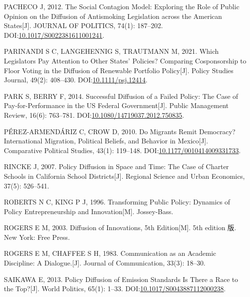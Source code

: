 \documentclass[
  12pt,
]{ctexart}
\newlength{\cslhangindent}
\newlength{\cslentryspacingunit} %
\newenvironment{CSLReferences}[2] %
 {%
  \setlength{\parindent}{0pt}
  \ifodd #1
  \let\oldpar\par
  \def\par{\hangindent=\cslhangindent\oldpar}
  \fi
  \setlength{\parskip}{#2\cslentryspacingunit}
 }%
 {}
\begin{document}
\begin{CSLReferences}{1}{0}
\leavevmode{}%
PACHECO J, 2012. The {Social Contagion Model}: {Exploring} the {Role} of {Public Opinion} on the {Diffusion} of {Antismoking Legislation} across the {American States}{[}J{]}. JOURNAL OF POLITICS, 74(1): 187--202. DOI:\href{https://doi.org/10.1017/S0022381611001241}{10.1017/S0022381611001241}.

\leavevmode{}%
PARINANDI S C, LANGEHENNIG S, TRAUTMANN M, 2021. Which {Legislators Pay Attention} to {Other States}' {Policies}? {Comparing Cosponsorship} to {Floor Voting} in the {Diffusion} of {Renewable Portfolio Policy}{[}J{]}. Policy Studies Journal, 49(2): 408--430. DOI:\href{https://doi.org/10.1111/psj.12414}{10.1111/psj.12414}.

\leavevmode{}%
PARK S, BERRY F, 2014. Successful {Diffusion} of a {Failed Policy}: {The} Case of Pay-for-Performance in the {US} Federal Government{[}J{]}. Public Management Review, 16(6): 763--781. DOI:\href{https://doi.org/10.1080/14719037.2012.750835}{10.1080/14719037.2012.750835}.

\leavevmode{}%
PÉREZ-ARMENDÁRIZ C, CROW D, 2010. Do {Migrants Remit Democracy}? {International Migration}, {Political Beliefs}, and {Behavior} in {Mexico}{[}J{]}. Comparative Political Studies, 43(1): 119--148. DOI:\href{https://doi.org/10.1177/0010414009331733}{10.1177/0010414009331733}.

\leavevmode{}%
RINCKE J, 2007. Policy Diffusion in Space and Time: {The} Case of Charter Schools in {California} School Districts{[}J{]}. Regional Science and Urban Economics, 37(5): 526--541.

\leavevmode{}%
ROBERTS N C, KING P J, 1996. Transforming Public Policy: {Dynamics} of Policy Entrepreneurship and Innovation{[}M{]}. {Jossey-Bass}.

\leavevmode{}%
ROGERS E M, 2003. Diffusion of {Innovations}, 5th {Edition}{[}M{]}. 5th edition 版. {New York}: {Free Press}.

\leavevmode{}%
ROGERS E M, CHAFFEE S H, 1983. Communication as an {Academic Discipline}: {A Dialogue}.{[}J{]}. Journal of Communication, 33(3): 18--30.

\leavevmode{}%
SAIKAWA E, 2013. Policy {Diffusion} of {Emission Standards Is There} a {Race} to the {Top}?{[}J{]}. World Politics, 65(1): 1--33. DOI:\href{https://doi.org/10.1017/S0043887112000238}{10.1017/S0043887112000238}.


\end{CSLReferences}
\end{document}
